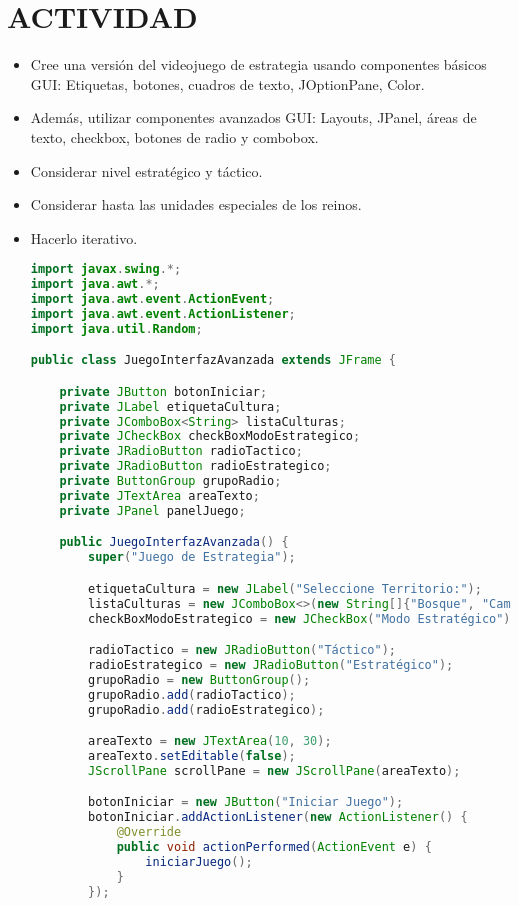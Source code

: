 \documentclass{article}
\begin{document}
    \section{ACTIVIDAD}
 \begin{itemize}
		\item Cree una versión del videojuego de estrategia usando componentes básicos GUI: Etiquetas, botones, cuadros de texto, JOptionPane, Color.
		\item Además, utilizar componentes avanzados GUI: Layouts, JPanel, áreas de texto, checkbox, botones de radio y combobox. 
		\item Considerar nivel estratégico y táctico. 
  	\item Considerar hasta las unidades especiales de los reinos.
        \item Hacerlo iterativo. 
        \\
        \begin{lstlisting}[language=java]
import javax.swing.*;
import java.awt.*;
import java.awt.event.ActionEvent;
import java.awt.event.ActionListener;
import java.util.Random;

public class JuegoInterfazAvanzada extends JFrame {

    private JButton botonIniciar;
    private JLabel etiquetaCultura;
    private JComboBox<String> listaCulturas;
    private JCheckBox checkBoxModoEstrategico;
    private JRadioButton radioTactico;
    private JRadioButton radioEstrategico;
    private ButtonGroup grupoRadio;
    private JTextArea areaTexto;
    private JPanel panelJuego;

    public JuegoInterfazAvanzada() {
        super("Juego de Estrategia");

        etiquetaCultura = new JLabel("Seleccione Territorio:");
        listaCulturas = new JComboBox<>(new String[]{"Bosque", "Campo abierto", "Montaña", "Desierto", "Playa"});
        checkBoxModoEstrategico = new JCheckBox("Modo Estratégico");

        radioTactico = new JRadioButton("Táctico");
        radioEstrategico = new JRadioButton("Estratégico");
        grupoRadio = new ButtonGroup();
        grupoRadio.add(radioTactico);
        grupoRadio.add(radioEstrategico);

        areaTexto = new JTextArea(10, 30);
        areaTexto.setEditable(false);
        JScrollPane scrollPane = new JScrollPane(areaTexto);

        botonIniciar = new JButton("Iniciar Juego");
        botonIniciar.addActionListener(new ActionListener() {
            @Override
            public void actionPerformed(ActionEvent e) {
                iniciarJuego();
            }
        });


\end{lstlisting}
\end{itemize}
\end{document}
